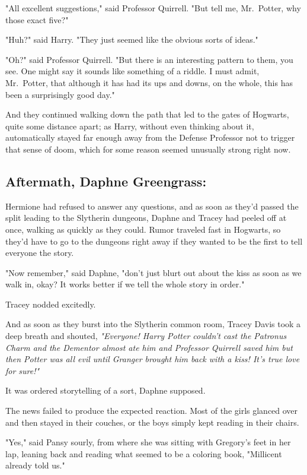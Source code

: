 "All excellent suggestions," said Professor Quirrell. "But tell me, Mr.~Potter,
why those exact five?"

"Huh?" said Harry. "They just seemed like the obvious sorts of ideas."

"Oh?" said Professor Quirrell. "But there is an interesting pattern to them,
you see. One might say it sounds like something of a riddle. I must admit,
Mr.~Potter, that although it has had its ups and downs, on the whole, this has
been a surprisingly good day."

And they continued walking down the path that led to the gates of Hogwarts,
quite some distance apart; as Harry, without even thinking about it,
automatically stayed far enough away from the Defense Professor not to trigger
that sense of doom, which for some reason seemed unusually strong right now.
\sbreak
\subsection{Aftermath, Daphne Greengrass:}

Hermione had refused to answer any questions, and as soon as they'd passed the
split leading to the Slytherin dungeons, Daphne and Tracey had peeled off at
once, walking as quickly as they could. Rumor traveled fast in Hogwarts, so
they'd have to go to the dungeons right away if they wanted to be the first to
tell everyone the story.

"Now remember," said Daphne, "don't just blurt out about the kiss as soon as we
walk in, okay? It works better if we tell the whole story in order."

Tracey nodded excitedly.

And as soon as they burst into the Slytherin common room, Tracey Davis took a
deep breath and shouted, \emph{"Everyone! Harry Potter couldn't cast the
Patronus Charm and the Dementor almost ate him and Professor Quirrell saved him
but then Potter was all evil until Granger brought him back with a kiss! It's
true love for sure!"}

It was ordered storytelling of a sort, Daphne supposed.

The news failed to produce the expected reaction. Most of the girls glanced
over and then stayed in their couches, or the boys simply kept reading in their
chairs.

"Yes," said Pansy sourly, from where she was sitting with Gregory's feet in her
lap, leaning back and reading what seemed to be a coloring book, "Millicent
already told us."


